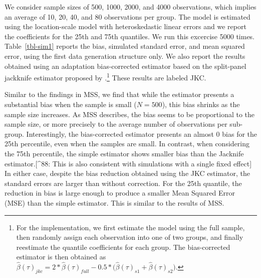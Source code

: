 \documentclass[
  12pt,
  oneside]{article}
\begin{document}
We consider sample sizes of 500, 1000, 2000, and 4000 observations,
which implies an average of 10, 20, 40, and 80 observations per group.
The model is estimated using the location-scale model with
heteroskedastic linear errors and we report the coefficients for the
25th and 75th quantiles. We run this excercise 5000 times.
Table~\ref{tbl-sim1} reports the bias, simulated standard error, and
mean squared error, using the first data generation structure only. We
also report the results obtained using an adaptation bias-corrected
estimator based on the split-panel jackknife estimator proposed by
\citet{dhaene2015}.\footnote{For the implementation, we first estimate
  the model using the full sample, then randomly assign each observation
  into one of two groups, and finally reestimate the quantile
  coefficients for each group. The bias-corrected estimator is then
  obtained as
  \(\hat\beta(\tau)_{jkc}=2*\hat\beta(\tau)_{full}-0.5*\big(\hat\beta(\tau)_{s1}+\hat\beta(\tau)_{s2}\big)\).}
These results are labeled JKC.

Similar to the findings in MSS, we find that while the estimator
presents a substantial bias when the sample is small (\(N=500\)), this
bias shrinks as the sample size increases. As MSS describes, the bias
seems to be proportional to the sample size, or more precisely to the
average number of observations per sub-group. Interestingly, the
bias-corrected estimator presents an almost 0 bias for the 25th
percentile, even when the samples are small. In contrast, when
considering the 75th percentile, the simple estimator shows smaller bias
than the Jacknife estimator.{[}\^{}88: This is also consistent with
simulations with a single fixed effect{]} In either case, despite the
bias reduction obtained using the JKC estimator, the standard errors are
larger than without correction. For the 25th quantile, the reduction in
bias is large enough to produce a smaller Mean Squared Error (MSE) than
the simple estimator. This is similar to the results of MSS.
\end{document}
